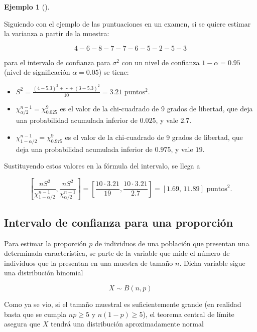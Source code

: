 \documentclass[
  a4paper,
]{scrreport}
\providecommand{\tightlist}{%
  \setlength{\itemsep}{0pt}\setlength{\parskip}{0pt}}\usepackage{longtable,booktabs,array}
\theoremstyle{plain}
\theoremstyle{definition}
\newtheorem{example}{Ejemplo}[chapter]
\theoremstyle{definition}
\theoremstyle{remark}
\begin{document}
\begin{example}[]\protect\hypertarget{exm-intervalo-confianza-varianza-normal}{}\label{exm-intervalo-confianza-varianza-normal}

Siguiendo con el ejemplo de las puntuaciones en un examen, si se quiere
estimar la varianza a partir de la muestra:

\[
4 - 6 - 8 - 7 - 7 - 6 - 5 - 2 - 5 - 3
\]

para el intervalo de confianza para \(\sigma^2\) con un nivel de
confianza \(1-\alpha=0.95\) (nivel de significación \(\alpha=0.05\)) se
tiene:

\begin{itemize}
\tightlist
\item
  \(S^2= \frac{(4-5.3)^2+\cdots+(3-5.3)^2}{10} = 3.21\) puntos\(^2\).
\item
  \(\chi^{n-1}_{\alpha/2}=\chi^9_{0.025}\) es el valor de la
  chi-cuadrado de 9 grados de libertad, que deja una probabilidad
  acumulada inferior de \(0.025\), y vale \(2.7\).
\item
  \(\chi^{n-1}_{1-\alpha/2}=\chi^9_{0.975}\) es el valor de la
  chi-cuadrado de 9 grados de libertad, que deja una probabilidad
  acumulada inferior de \(0.975\), y vale \(19\).
\end{itemize}

Sustituyendo estos valores en la fórmula del intervalo, se llega a

\[
\left[\frac{nS^2}{\chi^{n-1}_{1-\alpha/2}},\frac{nS^2}{\chi^{n-1}_{\alpha/2}}\right] =
\left[\frac{10\cdot 3.21}{19},\frac{10\cdot 3.21}{2.7}\right] = [1.69,\,11.89] \text{ puntos}^2.
\]

\end{example}

\subsection{Intervalo de confianza para una
proporción}\label{intervalo-de-confianza-para-una-proporciuxf3n}

Para estimar la proporción \(p\) de individuos de una población que
presentan una determinada característica, se parte de la variable que
mide el número de individuos que la presentan en una muestra de tamaño
\(n\). Dicha variable sigue una distribución binomial

\[
X\sim B(n,p)
\]

Como ya se vio, si el tamaño muestral es suficientemente grande (en
realidad basta que se cumpla \(np\geq 5\) y \(n(1-p)\geq 5\)), el
teorema central de límite asegura que \(X\) tendrá una distribución
aproximadamente normal
\end{document}
